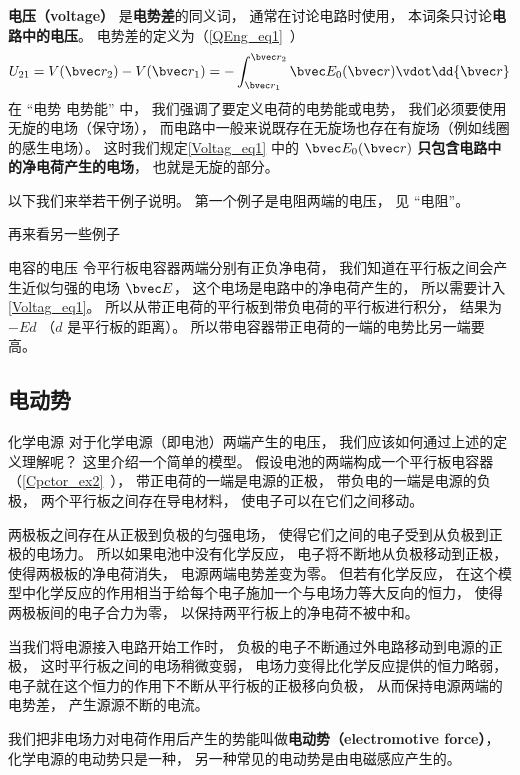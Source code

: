 

\textbf{电压（voltage）} 是\textbf{电势差}的同义词， 通常在讨论电路时使用， 本词条只讨论\textbf{电路中的电压}。 电势差的定义为（\autoref{QEng_eq1}~）
\begin{equation}\label{Voltag_eq1}
U_{21} = V(\bvec r_2) - V(\bvec r_1) = - \int_{\bvec r_1}^{\bvec r_2} \bvec E_0(\bvec r) \vdot \dd{\bvec r}
\end{equation}
在 “电势 电势能” 中， 我们强调了要定义电荷的电势能或电势， 我们必须要使用无旋的电场（保守场）， 而电路中一般来说既存在无旋场也存在有旋场（例如线圈的感生电场）。 这时我们规定\autoref{Voltag_eq1} 中的 $\bvec E_0(\bvec r)$ \textbf{只包含电路中的净电荷产生的电场}， 也就是无旋的部分。

以下我们来举若干例子说明。 第一个例子是电阻两端的电压， 见 “电阻”。

再来看另一些例子
\begin{example}{电容的电压}
令平行板电容器两端分别有正负净电荷， 我们知道在平行板之间会产生近似匀强的电场 $\bvec E$， 这个电场是电路中的净电荷产生的， 所以需要计入\autoref{Voltag_eq1}。 所以从带正电荷的平行板到带负电荷的平行板进行积分， 结果为 $-E d$ （$d$ 是平行板的距离）。 所以带电容器带正电荷的一端的电势比另一端要高。
\end{example}

\subsection{电动势}
\begin{example}{化学电源}
对于化学电源（即电池）两端产生的电压， 我们应该如何通过上述的定义理解呢？ 这里介绍一个简单的模型。 假设电池的两端构成一个平行板电容器（\autoref{Cpctor_ex2}~）， 带正电荷的一端是电源的正极， 带负电的一端是电源的负极， 两个平行板之间存在导电材料， 使电子可以在它们之间移动。

两极板之间存在从正极到负极的匀强电场， 使得它们之间的电子受到从负极到正极的电场力。 所以如果电池中没有化学反应， 电子将不断地从负极移动到正极， 使得两极板的净电荷消失， 电源两端电势差变为零。 但若有化学反应， 在这个模型中化学反应的作用相当于给每个电子施加一个与电场力等大反向的恒力， 使得两极板间的电子合力为零， 以保持两平行板上的净电荷不被中和。

当我们将电源接入电路开始工作时， 负极的电子不断通过外电路移动到电源的正极， 这时平行板之间的电场稍微变弱， 电场力变得比化学反应提供的恒力略弱， 电子就在这个恒力的作用下不断从平行板的正极移向负极， 从而保持电源两端的电势差， 产生源源不断的电流。
\end{example}
我们把非电场力对电荷作用后产生的势能叫做\textbf{电动势（electromotive force）}， 化学电源的电动势只是一种， 另一种常见的电动势是由电磁感应产生的。

